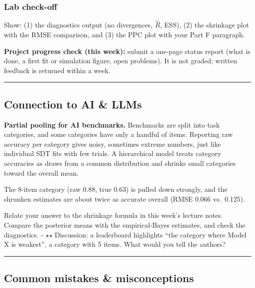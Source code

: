 \subsubsection{Lab check-off}

Show: (1) the diagnostics output (no divergences, \(\hat R\), ESS), (2)
the shrinkage plot with the RMSE comparison, and (3) the PPC plot with
your Part F paragraph.

\textbf{Project progress check (this week):} submit a one-page status
report (what is done, a first fit or simulation figure, open problems).
It is not graded; written feedback is returned within a week.

\begin{center}\rule{0.5\linewidth}{0.5pt}\end{center}

\subsection{Connection to AI \& LLMs}

\textbf{Partial pooling for AI benchmarks.} Benchmarks are split into
task categories, and some categories have only a handful of items.
Reporting raw accuracy per category gives noisy, sometimes extreme
numbers, just like individual SDT fits with few trials. A hierarchical
model treats category accuracies as draws from a common distribution and
shrinks small categories toward the overall mean.

The 8-item category (raw 0.88, true 0.63) is pulled down strongly, and
the shrunken estimates are about twice as accurate overall (RMSE 0.066
vs.~0.125).

Relate your answer to the shrinkage formula in this week's lecture
notes. Compare the posterior means with the empirical-Bayes estimates,
and check the diagnostics. - \ensuremath{\star}\ensuremath{\star} Discussion: a leaderboard highlights
``the category where Model X is weakest'', a category with 5 items. What
would you tell the authors?

\begin{center}\rule{0.5\linewidth}{0.5pt}\end{center}

\subsection{Common mistakes \& misconceptions}

